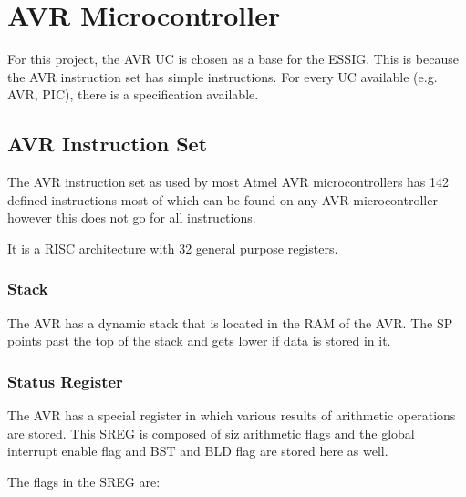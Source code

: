 \chapter{AVR Microcontroller}
For this project, the AVR \ac{UC} is chosen as a base for the \ac{ESSIG}. This
is because the AVR instruction set has simple instructions. For every \ac{UC}
available (e.g. AVR, PIC), there is a specification available.
 
%

\section{AVR Instruction Set}

The AVR instruction set as used by most Atmel AVR microcontrollers has 142 
defined instructions most of which can be found on any AVR microcontroller 
however this does not go for all instructions.

It is a RISC architecture with 32 general purpose registers. 

\subsection{Stack}

The AVR has a dynamic stack that is located in the RAM of the AVR.
The \ac{SP} points past the top of the stack and gets lower if data is 
stored in it.

\subsection{Status Register}

The AVR has a special register in which various results of arithmetic
operations are stored. This \ac{SREG} is composed of siz arithmetic
flags and the global interrupt enable flag and BST and BLD flag are 
stored here as well.

The flags in the \ac{SREG} are:


